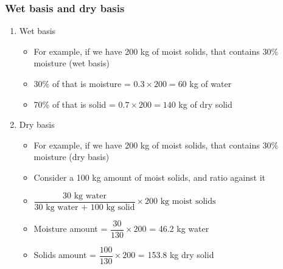 \begin{frame}\frametitle{Wet basis and dry basis}
	\begin{enumerate}
		\item	Wet basis
		\begin{itemize}
			\item	For example, if we have 200 kg of moist solids, that contains 30\% moisture (wet basis)
			\item	30\% of that is moisture = $0.3 \times 200 = 60$ kg of water
			\item	70\% of that is solid = $0.7 \times 200 = 140$ kg of dry solid
		\end{itemize}

		\vspace{24pt}
		\item	Dry basis
		\begin{itemize}
			\item	For example, if we have 200 kg of moist solids, that contains 30\% moisture (dry basis)
			\item	Consider a 100 kg amount of moist solids, and ratio against it

			\item	$\dfrac{\text{30 kg water}}{\text{30 kg water + 100 kg solid}} \times \text{200 kg moist solids}$
			\item	Moisture amount = $\dfrac{30}{130} \times 200$ = 46.2 kg water
			\item	Solids amount = $\dfrac{100}{130} \times 200$ = 153.8 kg dry solid
		\end{itemize}
	\end{enumerate}
\end{frame}

